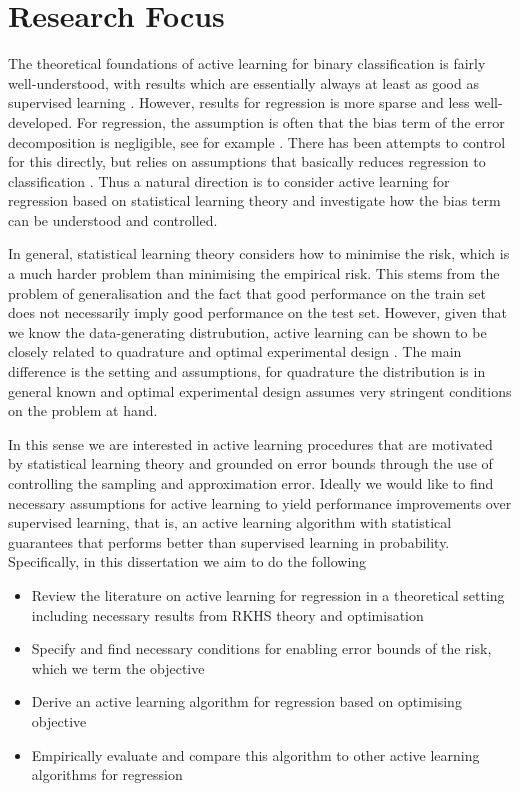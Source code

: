 \section{Research Focus}
The theoretical foundations of active learning for binary classification is
fairly well-understood, with results which are essentially always at least as
good as supervised learning \cite{balcan10_true_sampl_compl_activ_learn}. However,
results for regression is more sparse and less well-developed. For regression,
the assumption is often that the bias term of the error decomposition is
negligible, see for example \cite{cohn96_activ_learn_with_statis_model}. There has
been attempts to control for this directly, but relies on assumptions that
basically reduces regression to classification
\cite{willett06_faster_rates_regres_activ_learn}. Thus a natural direction is to
consider active learning for regression based on statistical learning theory and
investigate how the bias term can be understood and controlled.

In general, statistical learning theory considers how to minimise the risk,
which is a much harder problem than minimising the empirical risk. This stems
from the problem of generalisation and the fact that good performance on the
train set does not necessarily imply good performance on the test set. However,
given that we know the data-generating distrubution, active learning can be
shown to be closely related to quadrature \cite{briol15_frank_wolfe_bayes} and
optimal experimental design \cite{fedorov10_optim_exper_desig}. The main
difference is the setting and assumptions, for quadrature the distribution is in
general known and optimal experimental design assumes very
stringent conditions on the problem at hand.

In this sense we are interested in active learning procedures that are motivated
by statistical learning theory and grounded on error bounds through the use of
controlling the sampling and approximation error. Ideally we would like to find
necessary assumptions for active learning to yield performance improvements over
supervised learning, that is, an active learning algorithm with statistical
guarantees that performs better than supervised learning in probability.
Specifically, in this dissertation we aim to do the following 

\begin{itemize}
\item Review the literature on active learning for regression in a theoretical
  setting including necessary results from RKHS theory and optimisation
\item Specify and find necessary conditions for enabling error bounds of the risk,
  which we term the objective
\item Derive an active learning algorithm for regression based on optimising objective
\item Empirically evaluate and compare this algorithm to other active learning
  algorithms for regression
\end{itemize}

